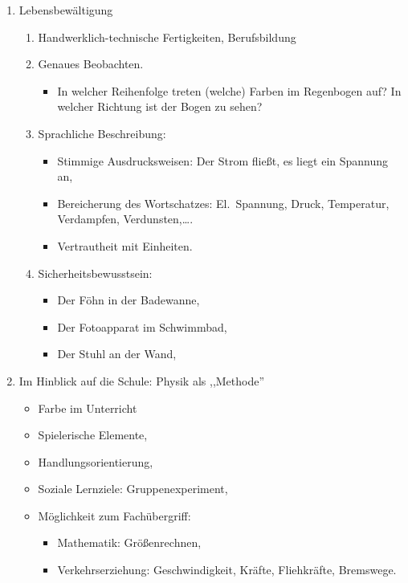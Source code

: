 \documentclass[11pt,a4paper]{book}
\begin{document}
\begin{enumerate}
\begin{enumerate}
\end{enumerate}

\item Lebensbew\"{a}ltigung

\begin{enumerate}

\item Handwerklich-technische Fertigkeiten, Berufsbildung
\item Genaues Beobachten.

\begin{itemize}
\item In welcher Reihenfolge treten (welche) Farben im Regenbogen auf?
In welcher Richtung ist der Bogen zu sehen?
\end{itemize}


\item Sprachliche Beschreibung:
\begin{itemize}
\item Stimmige Ausdrucksweisen: Der Strom flie{\ss}t, es liegt ein Spannung an,
\item Bereicherung des Wortschatzes: El.\ Spannung, Druck, Temperatur, Verdampfen, Verdunsten,\dots.
\item Vertrautheit mit Einheiten.
\end{itemize}

\item Sicherheitsbewusstsein:
\begin{itemize}
\item Der F\"{o}hn in der Badewanne,
\item Der Fotoapparat im Schwimmbad,
\item Der Stuhl an der Wand,
\end{itemize}

\end{enumerate}

\item
Im Hinblick auf die Schule: Physik als ,,Methode''

\begin{itemize}
\item Farbe im Unterricht
\item Spielerische Elemente,
\item Handlungsorientierung,
\item Soziale Lernziele: Gruppenexperiment,
\item M\"{o}glichkeit zum Fach\"{u}bergriff:
\begin{itemize}
\item Mathematik: Gr\"{o}{\ss}enrechnen,
\item Verkehrserziehung: Geschwindigkeit, Kr\"{a}fte, Fliehkr\"{a}fte, Bremswege.
\end{itemize}


\end{itemize}
\end{enumerate}
\end{document}
